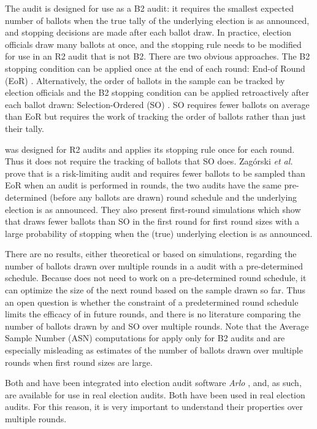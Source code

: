 The \BRAVO audit is designed for use as a B2 audit: it requires the smallest expected number of ballots when the true tally of the underlying election is as announced, and stopping decisions are made after each ballot draw. In practice, election officials draw many ballots at once, and the \BRAVO stopping rule needs to be modified for use in an R2 audit that is not B2. There are two obvious approaches. The B2 stopping condition can be applied once at the end of each round: End-of Round (EoR) \BRAVO.  Alternatively, the order of ballots in the sample can be tracked by election officials and the B2 \BRAVO stopping condition can be applied retroactively after each ballot drawn: Selection-Ordered (SO) \BRAVO. SO \BRAVO requires fewer ballots on average than EoR \BRAVO but requires the work of tracking the order of ballots rather than just their tally. 

\Minerva was designed for R2 audits and applies its stopping rule once for each round. Thus it does not require the tracking of ballots that SO \BRAVO does. Zag{\'o}rski {\em et al.} \cite{usenix_minerva} prove that \Minerva is a risk-limiting audit and requires fewer ballots to be sampled than EoR \BRAVO when an audit is performed in rounds, the two audits have the same pre-determined (before any ballots are drawn) round schedule and the underlying election is as announced. They also present first-round simulations which show that \Minerva draws fewer ballots than SO \BRAVO in the first round for first round sizes with a large probability of stopping when the (true) underlying election is as announced. 

There are no results, either theoretical or based on simulations, regarding the number of ballots drawn over multiple rounds in a \Minerva audit with a pre-determined schedule. Because \BRAVO does not need to work on a pre-determined round schedule, it can optimize the size of the next round based on the sample drawn so far. Thus an open question is whether the constraint of a predetermined round schedule limits the efficacy of \Minerva in future rounds, and there is no literature comparing the number of ballots drawn by \Minerva and SO \BRAVO over multiple rounds. Note that the Average Sample Number (ASN) computations for \BRAVO \cite{bravo} apply only for B2 audits and are especially misleading as estimates of the number of ballots drawn over multiple rounds when first round sizes are large. 

Both \BRAVO and \Minerva have been integrated into election audit software {\em Arlo} \cite{arlo}, and, as such, are available for use in real election audits. Both have been used in real election audits. For this reason, it is very important to understand their properties over multiple rounds. 

